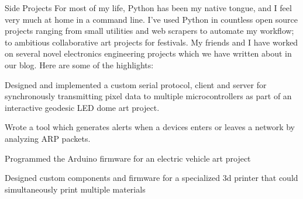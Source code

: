 \begin{cventries}

    \cventrysimple
        {Side Projects}
        {
            For most of my life, Python has been my native tongue, and I feel very much at home in a command line. I've used Python in countless open source projects ranging from small utilities and web scrapers to automate my workflow; to ambitious collaborative art projects for festivals. My friends and I have worked on several novel electronics engineering projects which we have written about in our blog. Here are some of the highlights:
        }
        {
            \begin{cvitems}
                \item { \acvSubItemSep Designed and implemented a custom serial protocol, client and server for synchronously transmitting pixel data to multiple microcontrollers as part of an interactive geodesic LED dome art project.}
                \item { \acvSubItemSep Wrote a tool which generates alerts when a devices enters or leaves a network by analyzing ARP packets.}
                \item { \acvSubItemSep Programmed the Arduino firmware for an electric vehicle art project}
                \item { \acvSubItemSep Designed custom components and firmware for a specialized 3d printer that could simultaneously print multiple materials}
            \end{cvitems}
        }



\end{cventries}
